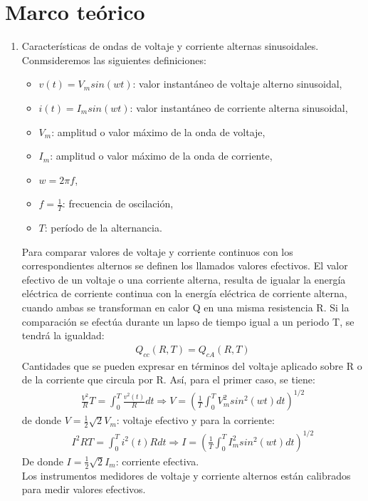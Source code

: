 \documentclass[]{article}
\begin{document}
\section{Marco teórico}
\begin{enumerate}
      \item Características de ondas de voltaje y corriente alternas sinusoidales. \\
      Conmsideremos las siguientes definiciones: 
      \begin{itemize}
            \item $v(t) = V_m sin(wt)$: valor instantáneo de voltaje alterno sinusoidal,
            \item $i(t) = I_m sin(wt)$: valor instantáneo de corriente alterna sinusoidal,
            \item $V_m$: amplitud o valor máximo de la onda de voltaje,
            \item $I_m$: amplitud o valor máximo de la onda de corriente,
            \item $w = 2 \pi f$,
            \item $f = \frac{1}{T}$: frecuencia de oscilación,
            \item $T$: período de la alternancia.
      \end{itemize}
      Para comparar valores de voltaje y corriente continuos con los correspondientes alternos se definen los llamados valores efectivos.
      El valor efectivo de un voltaje o una corriente alterna, resulta de igualar la energía eléctrica de corriente continua con la energía eléctrica de corriente alterna, 
      cuando ambas se transforman en calor Q en una misma resistencia R. Si la comparación se efectúa durante un lapso de tiempo igual a un periodo T, se tendrá la igualdad:
      \begin{align*}
            Q_{cc} (R,T) = Q_{cA}(R,T)
      \end{align*}
      Cantidades que se pueden expresar en términos del voltaje aplicado sobre R o de la corriente que circula por R.
       Así, para el primer caso, se tiene:
      \begin{align*}
            \frac{V^2}{R}T = \int_0 ^T \frac{v^2(t)}{R}dt \Rightarrow V = \left(\frac{1}{T} \int_0 ^T V_m ^2 sin^2 (wt) dt \right)^{1/2}
      \end{align*}
      de donde $V = \frac{1}{2} \sqrt{2}V_m$: voltaje efectivo y para la corriente:
      \begin{align*}
            I^2 RT = \int_0 ^T i^2 (t)R dt \Rightarrow I = \left(\frac{1}{T} \int_0 ^T I_m ^2 sin^2 (wt) dt \right)^{1/2}
      \end{align*}
      De donde $I = \frac{1}{2} \sqrt{2}I_m$: corriente efectiva. \\
      Los instrumentos medidores de voltaje y corriente alternos están calibrados para medir valores efectivos.
      

\end{enumerate}
\end{document}

